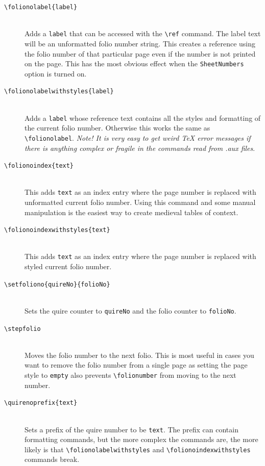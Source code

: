 \documentclass[a4paper, 12pt]{article}
\newcommand{\feature}[1]{\texttt{#1}}
\newcommand{\command}[1]{\texttt{\textbackslash{}#1}}
\newcommand{\commandone}[2]{\texttt{\textbackslash{}#1\{#2\}}}
\newcommand{\commandtwo}[3]{\texttt{\textbackslash{}#1\{#2\}\{#3\}}}
\newcommand{\argument}[1]{\texttt{#1}}
\begin{document}
\begin{description}
\item [\commandone{folionolabel}{label}] \mbox{} \\
  Adds a \argument{label} that can be accessed with the \command{ref}
  command. The label text will be an unformatted folio number string.
  This creates a reference using the folio number of that particular
  page even if the number is not printed on the page. This has the
  most obvious effect when the \feature{SheetNumbers} option is turned
  on.

\item [\commandone{folionolabelwithstyles}{label}] \mbox{} \\
  Adds a \argument{label} whose reference text contains all the styles
  and formatting of the current folio number. Otherwise this works the
  same as \command{folionolabel}. \emph{Note! It is very easy to get
    weird TeX error messages if there is anything complex or fragile
    in the commands read from .aux files}.

\item [\commandone{folionoindex}{text}] \mbox{} \\
  This adds \argument{text} as an index entry where the page number is
  replaced with unformatted current folio number. Using this command
  and some manual manipulation is the easiest way to create medieval
  tables of context. 

\item [\commandone{folionoindexwithstyles}{text}] \mbox{} \\
  This adds \argument{text} as an index entry where the page number is
  replaced with styled current folio number. 

\item [\commandtwo{setfoliono}{quireNo}{folioNo}] \mbox{} \\
  Sets the quire counter to \argument{quireNo} and the folio counter
  to \argument{folioNo}.

\item [\command{stepfolio}] \mbox{} \\
  Moves the folio number to the next folio. This is most useful in
  cases you want to remove the folio number from a single page as
  setting the page style to \argument{empty} also prevents
  \command{folionumber} from moving to the next number.

\item [\commandone{quirenoprefix}{text}] \mbox{} \\
  Sets a prefix of the quire number to be \argument{text}. The prefix
  can contain formatting commands, but the more complex the commands
  are, the more likely is that \command{folionolabelwithstyles} and
  \command{folionoindexwithstyles} commands break. 


\end{description}
\end{document}
